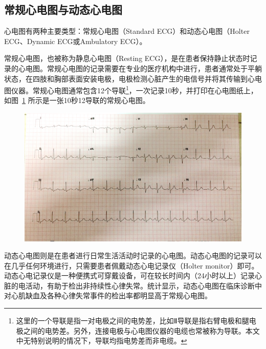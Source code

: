 \subsection{常规心电图与动态心电图}\label{subsec:standard-holter}

心电图有两种主要类型：常规心电图（Standard ECG）和动态心电图（Holter ECG、Dynamic ECG或Ambulatory ECG）。

常规心电图，也被称为静息心电图（Resting ECG），是在患者保持静止状态时记录的心电图。常规心电图的记录需要在专业的医疗机构中进行，患者通常处于平躺状态，在四肢和胸部表面安装电极，电极检测心脏产生的电信号并将其传输到心电图仪器。常规心电图通常包含12个导联\footnote{这里的一个导联是指一对电极之间的电势差，比如Ⅱ导联是指右臂电极和腿电极之间的电势差。另外，连接电极与心电图仪器的电缆也常被称为导联。本文中无特别说明的情况下，导联均指电势差而非电缆。}，一次记录10秒，并打印在心电图纸上，如图~\ref{fig:10sec-ekg-lead} 所示是一张10秒12导联的常规心电图。

\begin{figure}[h]
    \centering
    \includegraphics[width=\textwidth]{../assets/10sec-ekg-lead}
    \label{fig:10sec-ekg-lead}
\end{figure}

动态心电图则是在患者进行日常生活活动时记录的心电图。动态心电图的记录可以在几乎任何环境进行，只需要患者佩戴动态心电记录仪（Holter monitor）即可。动态心电记录仪是一种便携式可穿戴设备，可在较长时间内（24小时以上）记录心脏的电活动，有助于检出非持续性心律失常。统计显示，动态心电图在临床诊断中对心肌缺血及各种心律失常事件的检出率都明显高于常规心电图\cite{zhengDongtaixindiantuyuchangguixindiantuzhenduanguanxinbinghuanzhexinjiquexiejixinlushichangdelinchuangxiaoguobijiao2011}。

